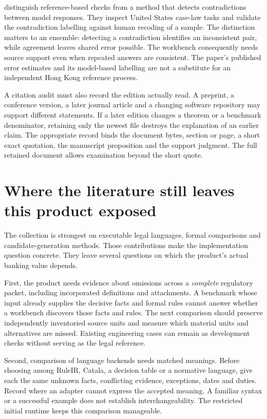 \documentclass[12pt,a4paper,oneside,openany]{book}
\begin{document}
\citet[sections 4.2--4.3 and appendix C]{legalfictions2024} distinguish
reference-based checks from a method that detects contradictions between model
responses. They inspect United States case-law tasks and validate the
contradiction labelling against human recoding of a sample. The distinction
matters to an ensemble: detecting a contradiction identifies an inconsistent
pair, while agreement leaves shared error possible. The workbench consequently
needs source support even when repeated answers are consistent. The paper's
published error estimates and its model-based labelling are not a substitute
for an independent Hong Kong reference process.

A citation audit must also record the edition actually read. A preprint, a
conference version, a later journal article and a changing software repository
may support different statements. If a later edition changes a theorem or a
benchmark denominator, retaining only the newest file destroys the explanation
of an earlier claim. The appropriate record binds the document bytes, section or
page, a short exact quotation, the manuscript proposition and the support
judgment. The full retained document allows examination beyond the short quote.

\section{Where the literature still leaves this product exposed}
\label{sec:remaining-literature-gaps}

The collection is strongest on executable legal languages, formal comparisons
and candidate-generation methods. Those contributions make the implementation
question concrete. They leave several questions on which the product's actual
banking value depends.

First, the product needs evidence about omissions across a \emph{complete}
regulatory packet, including incorporated definitions and attachments. A
benchmark whose input already supplies the decisive facts and formal rules
cannot answer whether a workbench discovers those facts and rules. The next
comparison should preserve independently inventoried source units and measure
which material units and alternatives are missed. Existing engineering cases
can remain as development checks without serving as the legal reference.

Second, comparison of language backends needs matched meanings. Before choosing
among RuleIR, Catala, a decision table or a normative language, give each the same
unknown facts, conflicting evidence, exceptions, dates and duties. Record where
an adapter cannot express the accepted meaning. A familiar syntax or a successful
example does not establish interchangeability. The restricted initial runtime
keeps this comparison manageable.
\end{document}

